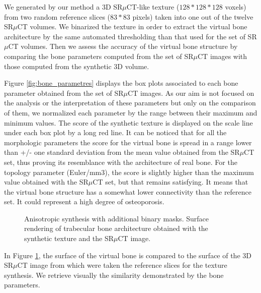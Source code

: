 We generated by our method a 3D SR$\mu$CT-like texture ($128 * 128 * 128$ voxels) from two random 
reference slices ($83 * 83$ pixels) taken into one out of the twelve SR$\mu$CT volumes.  
We binarized the texture in order to extract the virtual bone architecture by the same automated 
thresholding than that used for the set of SR$\mu$CT volumes. 
Then we assess the accuracy of the virtual bone structure by comparing the bone parameters computed 
from the set of SR$\mu$CT images with those computed from the synthetic 3D volume.

Figure \ref{fig:bone_parametres} displays the box plots associated to each bone parameter obtained 
from the set of SR$\mu$CT images. As our aim is not focused on the analysis or 
the interpretation of these parameters but only on the comparison of them, 
we normalized each parameter by the range between their maximum and minimum values. 
The score of the synthetic texture is displayed on the scale line under each box plot by a 
long red line. It can be noticed that for all the morphologic parameters the score for the 
virtual bone is spread in a range lower than +/- one standard deviation from the mean 
value obtained from the SR$\mu$CT set, thus proving its resemblance with the architecture of real bone. 
For the topology parameter (Euler/mm3), the score is slightly higher than the maximum value 
obtained with the SR$\mu$CT set, but that remains satisfying. It means that the virtual bone 
structure has a somewhat lower connectivity than the reference set. It could represent a high degree of osteoporosis.  

\begin{figure} 
 \centering
 \caption{Anisotropic synthesis with additional binary masks. Surface rendering of trabecular bone architecture obtained with the synthetic texture and the SR$\mu$CT image.}
 \label{fig:bone_surface_rendering} 
\end{figure}

In Figure \ref{fig:bone_surface_rendering}, the surface of the virtual bone is 
compared to the surface of the 3D SR$\mu$CT image from which were taken 
the reference slices for the texture synthesis. 
We retrieve visually the similarity demonstrated by the bone parameters.


